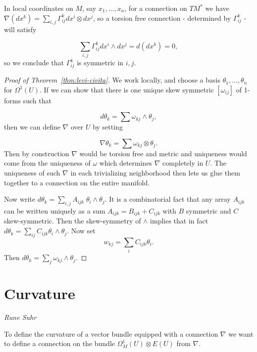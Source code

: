 \documentclass[a4paper,openany]{scrbook}
\newcommand{\chapterauthor}[1]{\hfill\emph{#1}\par\noindent}
\begin{document}
In local coordinates on $M$, say $x_1,\dots,x_n$, for a connection on $TM^*$ we have $\nabla ( d x^k)=\sum_{i,j} \Gamma_{ij}^k  d x^i \otimes  d x^j$, so a torsion free connection - determined by $\Gamma_{ij}^k$ - will satisfy

\begin{equation*}
\sum_{i,j} \Gamma_{ij}^k  d x^i \wedge  d x^j = d ( d x^k)=0,
\end{equation*} so we conclude that $\Gamma_{ij}^k$ is symmetric in $i,j$.


\begin{proof}[Proof of Theorem~\ref{thm:levi-civita}]
We work locally, and choose a basis $\theta_1,\dots,\theta_n$ for $\Omega^1(U)$. If we can show that there is one unique skew symmetric $[\omega_{ij}]$ of 1-forms such that

\begin{equation}
 d \theta_k =\sum \omega_{kj} \wedge \theta_j, 
\end{equation} then we can define $\nabla$ over $U$ by setting

\begin{equation}
\nabla \theta_k = \sum \omega_{kj} \otimes \theta_j.
\end{equation} Then by construction $\nabla$ would be torsion free and metric and uniqueness would come from the uniqueness of $\omega$ which determines $\nabla$ completely in $U$. The uniqueness of such $\nabla$ in each trivializing neighborhood then lets us glue them together to a connection on the entire manifold. 

Now write $d\theta_k =\sum_{i,j} A_{ijk}\; \theta_i \wedge \theta_j$. It is a combinatorial fact that any array $A_{ijk}$ can be written uniquely as a sum $A_{ijk}=B_{ijk} + C_{ijk}$ with $B$ symmetric and $C$ skew-symmetric. Then the skew-symmetry of $\wedge$ implies that in fact $d\theta_k =\sum_{ij}C_{ijk} \theta_i \wedge \theta_j$. Now set 
\begin{equation*}
w_{kj}=\sum_i C_{ijk} \theta_i.
\end{equation*} Then $ d \theta_k = \sum_j \omega_{kj} \wedge \theta_j$.
\end{proof}


\section{Curvature}
\chapterauthor{Rune Suhr}

To define the curvature of a vector bundle equipped with a connection $\nabla$ we want to define a connection on the bundle $\Omega^1_M(U) \otimes E(U)$ from $\nabla$.
\end{document}
